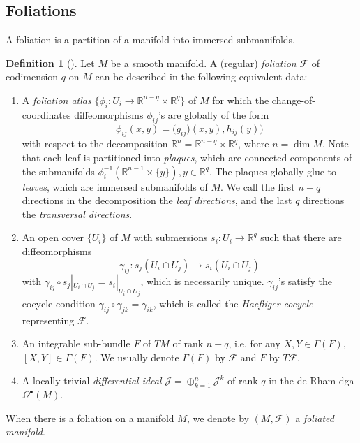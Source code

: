 \documentclass[12pt]{amsart}
\theoremstyle{definition}
\newtheorem{defn}[thm]{Definition}
\theoremstyle{remark}
\numberwithin{equation}{section}
\newcommand{\CF}{{\mathcal F}}
\newcommand{\R}{{\mathbb{R}}}
\newcommand{\1}{{\mathbb{1}}}
\newcommand{\bt}{\bullet}
\begin{document}
\subsection{Foliations}
A foliation is a partition of a manifold into immersed submanifolds.
\begin{defn}[\cite{MM03}]
    Let $M$ be a smooth manifold. A (regular) {\it foliation} $\CF$ of codimension $q$ on $M$ can be described in the following equivalent data:
    \begin{enumerate}
        \item A {\it foliation atlas} $\{\phi_i: U_i\to \R^{n-q}\times \R^q\}$ of $M$ for which the change-of-coordinates diffeomorphisms $\phi_{ij}$'s are globally of the form
        $$
        \phi_{ij}(x,y) = \big(g_{ij})(x,y), h_{ij}(y) \big)
        $$
        with respect to the decomposition $\R^n = \R^{n-q} \times \R^q$, where $n = \dim M$.  Note that each leaf is partitioned into {\it plaques}, which are connected components of the submanifolds $\phi^{-1}_i(\R^{n-1}\times \{y\}), y \in \R^q$. The plaques globally glue to {\it leaves}, which are immersed submanifolds of $M$. We call the first $n-q$ directions in the decomposition the {\it leaf directions}, and the last $q$ directions the {\it transversal directions}.
        \item An open cover $\{U_i\}$ of $M$ with submersions $s_i : U_i \to \R^q$ such that there are diffeomorphisms 
        $$
        \gamma_{ij}: s_j(U_i\cap U_j) \to s_i(U_i\cap U_j)
        $$
        with $\gamma_{ij}\circ s_j|_{U_i\cap U_j} = s_i|_{U_i\cap U_j}$, which is necessarily unique. $\gamma_{ij}$'s satisfy the cocycle condition $\gamma_{ij}\circ \gamma_{jk} = \gamma_{ik}$, which is called the {\it Haefliger cocycle} representing $\CF$.
        \item An integrable sub-bundle $F$ of $TM$ of rank $n-q$, i.e. for any $X, Y \in \Gamma(F)$, $[X, Y]\in \Gamma(F)$. We usually denote $\Gamma(F)$ by $\CF$ and $F$ by $T\CF$.
        \item A locally trivial {\it differential ideal} $\mathcal{J} = \oplus_{k=1}^n \mathcal{J}^k$ of rank $q$ in the de Rham dga $\Omega^{\bt}(M)$. 
    \end{enumerate}
	When there is a foliation on a manifold $M$, we denote by $(M, \CF)$ a {\it foliated manifold}.
\end{defn}
\end{document}
